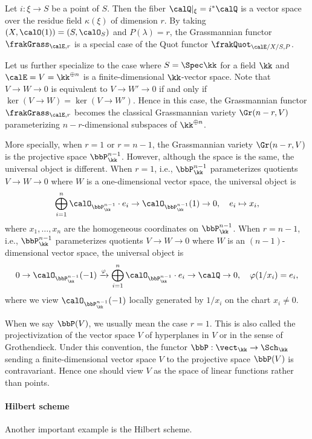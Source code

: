     Let \(i:\xi \to S\) be a point of \(S\).
    Then the fiber \(\calQ|_{\xi} = i^*\calQ\) is a vector space over the residue field \(\kappa(\xi)\) of dimension \(r\).
    By taking \((X,\calO(1)) = (S, \calO_{S})\) and \(P(\lambda) = r\), the Grassmannian functor \(\frakGrass_{\calE,r}\) is a special case of the Quot functor \(\frakQuot_{\calE/X/S,P}\).

    Let us further specialize to the case where \(S = \Spec \kk\) for a field \(\kk\) and \(\calE = V = \kk^{\oplus n}\) is a finite-dimensional \(\kk\)-vector space.
    Note that \(V \to W \to 0\) is equivalent to \(V \to W' \to 0\) if and only if \(\ker(V \to W) = \ker(V \to W')\).
    Hence in this case, the Grassmannian functor \(\frakGrass_{\calE,r}\) becomes the classical Grassmannian variety \(\Gr(n-r,V)\) parameterizing \(n-r\)-dimensional subspaces of \(\kk^{\oplus n}\).

    More specially, when \(r = 1\) or \(r = n-1\), the Grassmannian variety \(\Gr(n-r,V)\) is the projective space \(\bbP^{n-1}_\kk\).
    However, although the space is the same, the universal object is different.
    When \(r=1\), i.e., \(\bbP_\kk^{n-1}\) parameterizes quotients \(V \to W \to 0\) where \(W\) is a one-dimensional vector space, the universal object is 
    \[ \bigoplus_{i=1}^n \calO_{\bbP_\kk^{n-1}} \cdot e_i \to \calO_{\bbP_\kk^{n-1}}(1) \to 0, \quad e_i \mapsto x_i, \]
    where \(x_1,\ldots,x_n\) are the homogeneous coordinates on \(\bbP_\kk^{n-1}\).
    When \(r=n-1\), i.e., \(\bbP_\kk^{n-1}\) parameterizes quotients \(V \to W \to 0\) where \(W\) is an \((n-1)\)-dimensional vector space, the universal object is
    \[ 0 \to \calO_{\bbP_\kk^{n-1}}(-1) \xrightarrow{\varphi} \bigoplus_{i=1}^n \calO_{\bbP_\kk^{n-1}} \cdot e_i \to \calQ \to 0, \quad \varphi(1/x_i) = e_i, \]
    where we view \(\calO_{\bbP_\kk^{n-1}}(-1)\) locally generated by \(1/x_i\) on the chart \(x_i \neq 0\).

    When we say \(\bbP(V)\), we usually mean the case \(r=1\).
    This is also called the projectivization of the vector space \(V\) of hyperplanes in \(V\) or in the sense of Grothendieck.
    Under this convention, the functor \(\bbP: \vect_\kk \to \Sch_\kk\) sending a finite-dimensional vector space \(V\) to the projective space \(\bbP(V)\) is contravariant.
    Hence one should view \(V\) as the space of linear functions rather than points.


    \paragraph{Hilbert scheme} Another important example is the Hilbert scheme.

